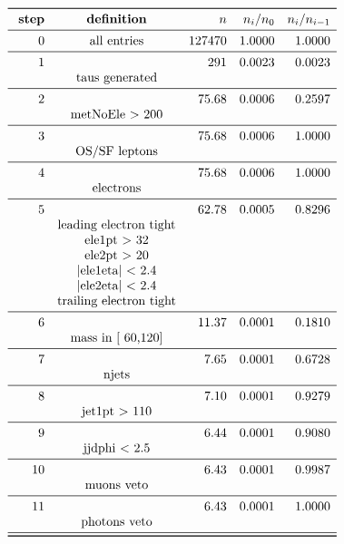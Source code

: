 \documentclass[11pt,a4paper]{article}
\begin{document}
\begin{table}
\caption{\emph{Entries after each selection step, normalised to 5.00 $fb^{-1}$; n is the number of entries after the i-th selection step; Note that cuts on second jet are applied only if a second jet exists with $p_t$ > 30\,GeV.}}
\[
\begin{array}{rcrrr}
\toprule
\ \textbf{step}& \textbf{definition}  & n  &  n_i/n_0 & n_i/n_{i-1}  \\ 
\midrule
 0  & \text{all entries} & 127470 & 1.0000 & 1.0000 \\
\midrule
 1  & &    291 & 0.0023 & 0.0023 \\
& \text{taus generated} & & & \\
\midrule
 2  & &  75.68 & 0.0006 & 0.2597 \\
& \text{metNoEle > 200} & & & \\
\midrule
 3  & &  75.68 & 0.0006 & 1.0000 \\
& \text{OS/SF leptons} & & & \\
\midrule
 4  & &  75.68 & 0.0006 & 1.0000 \\
& \text{electrons} & & & \\
\midrule
 5  & &  62.78 & 0.0005 & 0.8296 \\
& \text{leading electron tight} & & & \\
& \text{ele1pt >  32} & & & \\
& \text{ele2pt >  20} & & & \\
& \text{|ele1eta| < 2.4} & & & \\
& \text{|ele2eta| < 2.4} & & & \\
& \text{trailing electron tight} & & & \\
\midrule
 6  & &  11.37 & 0.0001 & 0.1810 \\
& \text{mass in [ 60,120]} & & & \\
\midrule
 7  & &   7.65 & 0.0001 & 0.6728 \\
& \text{njets} & & & \\
\midrule
 8  & &   7.10 & 0.0001 & 0.9279 \\
& \text{jet1pt >  110} & & & \\
\midrule
 9  & &   6.44 & 0.0001 & 0.9080 \\
& \text{jjdphi < 2.5} & & & \\
\midrule
 10  & &   6.43 & 0.0001 & 0.9987 \\
& \text{muons veto} & & & \\
\midrule
 11  & &   6.43 & 0.0001 & 1.0000 \\
& \text{photons veto} & & & \\
\midrule
\bottomrule
\end{array}
\]
\end{table}
\end{document}
